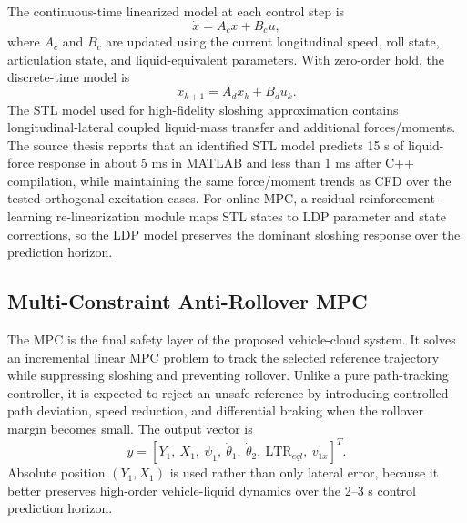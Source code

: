 The continuous-time linearized model at each control step is
\begin{equation}
  \dot{x}=A_c x+B_c u,
  \label{eq:continuous_ltv}
\end{equation}
where $A_c$ and $B_c$ are updated using the current longitudinal speed, roll state, articulation state, and liquid-equivalent parameters. With zero-order hold, the discrete-time model is
\begin{equation}
  x_{k+1}=A_d x_k+B_d u_k.
  \label{eq:discrete_control_model}
\end{equation}
The STL model used for high-fidelity sloshing approximation contains longitudinal-lateral coupled liquid-mass transfer and additional forces/moments. The source thesis reports that an identified STL model predicts 15 s of liquid-force response in about 5 ms in MATLAB and less than 1 ms after C++ compilation, while maintaining the same force/moment trends as CFD over the tested orthogonal excitation cases. For online MPC, a residual reinforcement-learning re-linearization module maps STL states to LDP parameter and state corrections, so the LDP model preserves the dominant sloshing response over the prediction horizon.

\subsection{Multi-Constraint Anti-Rollover MPC}

The MPC is the final safety layer of the proposed vehicle-cloud system. It solves an incremental linear MPC problem to track the selected reference trajectory while suppressing sloshing and preventing rollover. Unlike a pure path-tracking controller, it is expected to reject an unsafe reference by introducing controlled path deviation, speed reduction, and differential braking when the rollover margin becomes small. The output vector is
\begin{equation}
  y=[Y_1,\ X_1,\ \psi_1,\ \dot{\theta}_1,\ \dot{\theta}_2,\ \mathrm{LTR}_{eql},\ v_{1x}]^T.
  \label{eq:mpc_output}
\end{equation}
Absolute position $(Y_1,X_1)$ is used rather than only lateral error, because it better preserves high-order vehicle-liquid dynamics over the 2--3 s control prediction horizon.

